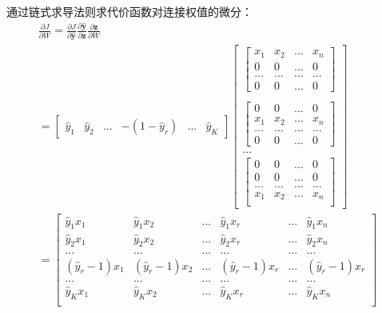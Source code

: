 \documentclass[UTF8]{article}
\begin{document}
通过链式求导法则求代价函数对连接权值的微分：
\begin{equation}
\begin{aligned}
\frac{\partial{J}}{\partial{W}}=\frac{\partial{J}}{\partial{\hat{\boldsymbol{y}}}} \frac{\partial{\hat{\boldsymbol{y}}}}{\partial{\boldsymbol{z}}} \frac{\partial{\boldsymbol{z}}}{\partial{W}} \\
=\begin{bmatrix}
\hat{y}_{1} & \hat{y}_{2} & ... & -(1-\hat{y}_{r}) & ... & \hat{y}_{K}
\end{bmatrix} \begin{bmatrix}
\begin{bmatrix}
x_{1} & x_{2} & ... & x_{n} \\
0 & 0 & ... &　0 \\
... & ... & ... & ... \\
0 & 0 & ... & 0
\end{bmatrix} \\ \\
\begin{bmatrix}
0 & 0 & ... & 0 \\
x_{1} & x_{2} & ... & x_{n} \\
... & ... & ... & ... \\
0 & 0 & ... & 0
\end{bmatrix} \\
... \\
\begin{bmatrix}
0 & 0 & ... & 0 \\
0 & 0 & ... & 0 \\
... & ... & ... & ... \\
x_{1} & x_{2} & ... & x_{n} \\
\end{bmatrix}
\end{bmatrix} \\
=\begin{bmatrix}
\hat{y}_{1}x_{1} & \hat{y}_{1}x_{2} & ... & \hat{y}_{1}x_{r} & ... & \hat{y}_{1}x_{n} \\
\hat{y}_{2}x_{1} & \hat{y}_{2}x_{2} & ... & \hat{y}_{2}x_{r} & ... & \hat{y}_{2}x_{n} \\
... & ... & ... & ... & ... & ... \\
(\hat{y}_{r}-1)x_{1} & (\hat{y}_{r}-1)x_{2} & ... & (\hat{y}_{r}-1)x_{r} & ... & (\hat{y}_{r}-1)x_{r} \\
... & ... & ... & ... & ... & ... \\
\hat{y}_{K}x_{1} & \hat{y}_{K}x_{2} & ... & \hat{y}_{K}x_{r} & ... & \hat{y}_{K}x_{n} \\

\end{bmatrix}
\end{aligned}
\end{equation}
\end{document}
